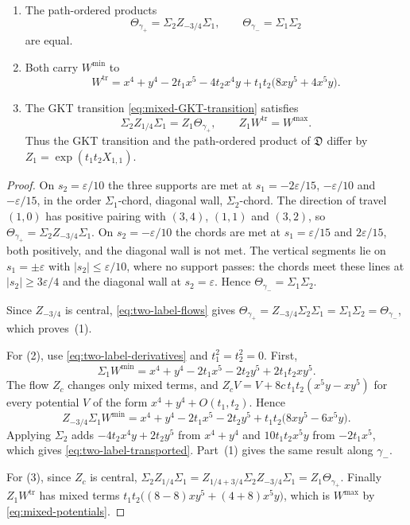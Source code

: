\begin{proposition}
\label{prop:two-label-transport}
\begin{enumerate}
\item The path-ordered products
\[
 \Theta_{\gamma_+}=\Sigma_2Z_{-3/4}\Sigma_1,
 \qquad
 \Theta_{\gamma_-}=\Sigma_1\Sigma_2
\]
are equal.
\item Both carry $W^{\min}$ to
\begin{equation}\label{eq:two-label-transported}
 W^{\mathrm{tr}}
 =x^4+y^4-2t_1x^5-4t_2x^4y+t_1t_2\bigl(8xy^5+4x^5y\bigr).
\end{equation}
\item The GKT transition \eqref{eq:mixed-GKT-transition} satisfies
\[
 \Sigma_2Z_{1/4}\Sigma_1=Z_1\Theta_{\gamma_+},
 \qquad
 Z_1W^{\mathrm{tr}}=W^{\max}.
\]
Thus the GKT transition and the path-ordered product of $\mathfrak D$ differ by $Z_1=\exp(t_1t_2X_{1,1})$.
\end{enumerate}
\end{proposition}

\begin{proof}
On $s_2=\varepsilon/10$ the three supports are met at
$s_1=-2\varepsilon/15$, $-\varepsilon/10$ and $-\varepsilon/15$, in the order
$\Sigma_1$-chord, diagonal wall, $\Sigma_2$-chord.  The direction of travel $(1,0)$ has
positive pairing with $(3,4)$, $(1,1)$ and $(3,2)$, so
$\Theta_{\gamma_+}=\Sigma_2Z_{-3/4}\Sigma_1$.  On
$s_2=-\varepsilon/10$ the chords are met at $s_1=\varepsilon/15$ and
$2\varepsilon/15$, both positively, and the diagonal wall is not met.  The
vertical segments lie on $s_1=\pm\varepsilon$ with $|s_2|\leq\varepsilon/10$,
where no support passes: the chords meet these lines at $|s_2|\geq
3\varepsilon/4$ and the diagonal wall at $s_2=\varepsilon$.  Hence
$\Theta_{\gamma_-}=\Sigma_1\Sigma_2$.

Since $Z_{-3/4}$ is central, \eqref{eq:two-label-flows} gives
$\Theta_{\gamma_+}=Z_{-3/4}\Sigma_2\Sigma_1=\Sigma_1\Sigma_2=\Theta_{\gamma_-}$,
which proves~(1).

For (2), use \eqref{eq:two-label-derivatives} and $t_1^2=t_2^2=0$.  First,
\[
 \Sigma_1W^{\min}=x^4+y^4-2t_1x^5-2t_2y^5+2t_1t_2xy^5.
\]
The flow $Z_c$ changes only mixed terms, and
$Z_cV=V+8c\,t_1t_2(x^5y-xy^5)$ for every potential $V$ of the form
$x^4+y^4+O(t_1,t_2)$.  Hence
\[
 Z_{-3/4}\Sigma_1W^{\min}
 =x^4+y^4-2t_1x^5-2t_2y^5+t_1t_2\bigl(8xy^5-6x^5y\bigr).
\]
Applying $\Sigma_2$ adds $-4t_2x^4y+2t_2y^5$ from $x^4+y^4$ and $10t_1t_2x^5y$
from $-2t_1x^5$, which gives \eqref{eq:two-label-transported}.  Part~(1)
gives the same result along $\gamma_-$.

For (3), since $Z_c$ is central,
$\Sigma_2Z_{1/4}\Sigma_1=Z_{1/4+3/4}\Sigma_2Z_{-3/4}\Sigma_1=Z_1\Theta_{\gamma_+}$.  Finally
$Z_1W^{\mathrm{tr}}$ has mixed terms $t_1t_2\bigl((8-8)xy^5+(4+8)x^5y\bigr)$,
which is $W^{\max}$ by \eqref{eq:mixed-potentials}.
\end{proof}

